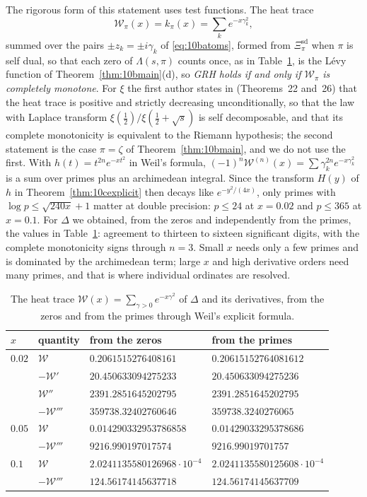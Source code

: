 The rigorous form of this statement uses test functions. The heat trace
\[
\mathcal W_\pi(x) = k_\pi(x) = \sum_ke^{-x\gamma_k^2},
\]
summed over the pairs $\pm z_k = \pm i\gamma_k$ of \eqref{eq:10batoms}, formed from $\Xi^{\mathrm{sd}}_\pi$ when $\pi$ is self dual, so that each zero of $\Lambda(s,\pi)$ counts once, as in Table~\ref{tab:10dheat}, is the L\'evy function of Theorem~\ref{thm:10bmain}(d), so \emph{GRH holds if and only if $\mathcal W_\pi$ is completely monotone}. For $\xi$ the first author states in \cite{polson2018vdp} (Theorems~22 and~26) that the heat trace is positive and strictly decreasing unconditionally, so that the law with Laplace transform $\xi(\frac12)/\xi(\frac12+\sqrt s)$ is self decomposable, and that its complete monotonicity is equivalent to the Riemann hypothesis; the second statement is the case $\pi = \zeta$ of Theorem~\ref{thm:10bmain}, and we do not use the first. With $h(t) = t^{2n}e^{-xt^2}$ in Weil's formula, $(-1)^n\mathcal W^{(n)}(x) = \sum\gamma_k^{2n}e^{-x\gamma_k^2}$ is a sum over primes plus an archimedean integral. Since the transform $H(y)$ of $h$ in Theorem~\ref{thm:10cexplicit} then decays like $e^{-y^2/(4x)}$, only primes with $\log p\le\sqrt{240x}+1$ matter at double precision: $p\le24$ at $x = 0.02$ and $p\le365$ at $x = 0.1$. For $\Delta$ we obtained, from the zeros and independently from the primes, the values in Table~\ref{tab:10dheat}: agreement to thirteen to sixteen significant digits, with the complete monotonicity signs through $n=3$. Small $x$ needs only a few primes and is dominated by the archimedean term; large $x$ and high derivative orders need many primes, and that is where individual ordinates are resolved.

\begin{table}[t]
\centering\footnotesize
\begin{tabular}{llll}
\toprule
$x$ & quantity & from the zeros & from the primes\\
\midrule
$0.02$ & $\mathcal W$ & $0.2061515276408161$ & $0.20615152764081612$\\
 & $-\mathcal W'$ & $20.450633094275233$ & $20.450633094275236$\\
 & $\mathcal W''$ & $2391.2851645202795$ & $2391.2851645202795$\\
 & $-\mathcal W'''$ & $359738.32402760646$ & $359738.3240276065$\\
$0.05$ & $\mathcal W$ & $0.014290332953786858$ & $0.01429033295378686$\\
 & $-\mathcal W'''$ & $9216.990197017574$ & $9216.99019701757$\\
$0.1$ & $\mathcal W$ & $2.0241135580126968\cdot10^{-4}$ & $2.0241135580125608\cdot10^{-4}$\\
 & $-\mathcal W'''$ & $124.56174145637718$ & $124.56174145637709$\\
\bottomrule
\end{tabular}
\caption{The heat trace $\mathcal W(x) = \sum_{\gamma>0}e^{-x\gamma^2}$ of $\Delta$ and its derivatives, from the zeros and from the primes through Weil's explicit formula.}\label{tab:10dheat}
\end{table}

